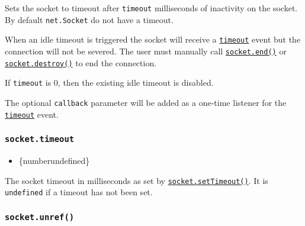 Sets the socket to timeout after \texttt{timeout} milliseconds of
inactivity on the socket. By default \texttt{net.Socket} do not have a
timeout.

When an idle timeout is triggered the socket will receive a
\hyperref[event-timeout]{\texttt{\textquotesingle{}timeout\textquotesingle{}}}
event but the connection will not be severed. The user must manually
call \hyperref[socketenddata-encoding-callback]{\texttt{socket.end()}}
or \hyperref[socketdestroyerror]{\texttt{socket.destroy()}} to end the
connection.

\begin{Shaded}
\begin{Highlighting}[]
\NormalTok{(}\NormalTok{)}\OperatorTok{;}
\NormalTok{(}\OperatorTok{,}\NormalTok{ () }\KeywordTok{=\textgreater{}}\NormalTok{ \{}
  \NormalTok{(}\NormalTok{)}\OperatorTok{;}
\NormalTok{()}\OperatorTok{;}
\NormalTok{\})}\OperatorTok{;}
\end{Highlighting}
\end{Shaded}

If \texttt{timeout} is 0, then the existing idle timeout is disabled.

The optional \texttt{callback} parameter will be added as a one-time
listener for the
\hyperref[event-timeout]{\texttt{\textquotesingle{}timeout\textquotesingle{}}}
event.

\subsubsection{\texorpdfstring{\texttt{socket.timeout}}{socket.timeout}}\label{socket.timeout}

\begin{itemize}
\tightlist
\item
  \{number\textbar undefined\}
\end{itemize}

The socket timeout in milliseconds as set by
\hyperref[socketsettimeouttimeout-callback]{\texttt{socket.setTimeout()}}.
It is \texttt{undefined} if a timeout has not been set.

\subsubsection{\texorpdfstring{\texttt{socket.unref()}}{socket.unref()}}\label{socket.unref}

